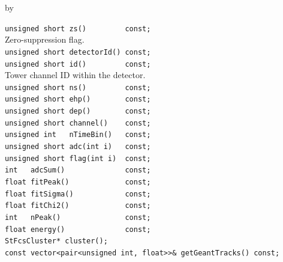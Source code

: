 \documentclass[twoside]{article}
\newcommand{\entrylabel}[1]{\mbox{\textbf{{#1}}}\hfil}%
\newenvironment{entry}
{\begin{list}{}%
    {\renewcommand{\makelabel}{\entrylabel}%
     \setlength{\labelwidth}{90pt}%
     \setlength{\leftmargin}{\labelwidth}
     \advance\leftmargin by \labelsep%
      }%
    }%
  {\end{list}}
\newcommand{\Entrylabel}[1]%
{\raisebox{0pt}[1ex][0pt]{\makebox[\labelwidth][l]%
    {\parbox[t]{\labelwidth}{\hspace{0pt}\textbf{{#1}}}}}}
\newenvironment{Entry}%
{\renewcommand{\entrylabel}{\Entrylabel}\begin{entry}}%
  {\end{entry}}
\begin{document}
\begin{Entry}
\item[Public Member\\ Functions]
    \verb+unsigned short zs()         const;+\\
        Zero-suppression flag.\\
    \verb+unsigned short detectorId() const;+\\
    \verb+unsigned short id()         const;+\\
        Tower channel ID within the detector.\\
    \verb+unsigned short ns()         const;+\\
    \verb+unsigned short ehp()        const;+\\
    \verb+unsigned short dep()        const;+\\
    \verb+unsigned short channel()    const;+\\
    \verb+unsigned int   nTimeBin()   const;+\\
    \verb+unsigned short adc(int i)   const;+\\
    \verb+unsigned short flag(int i)  const;+\\
    \verb+int   adcSum()              const;+\\
    \verb+float fitPeak()             const;+\\
    \verb+float fitSigma()            const;+\\
    \verb+float fitChi2()             const;+\\
    \verb+int   nPeak()               const;+\\
    \verb+float energy()              const;+\\
    \verb+StFcsCluster* cluster();+\\
    \verb+const vector<pair<unsigned int, float>>& getGeantTracks() const;+\\
\end{Entry}
\clearpage

\end{document}

